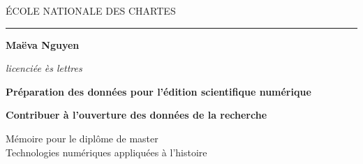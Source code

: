 \begin{titlepage}
    \begin{center}
        
        \bigskip
        
        \begin{large}
            ÉCOLE NATIONALE DES CHARTES
        \end{large}
        \begin{center}\rule{2cm}{0.02cm}\end{center}
        
        \bigskip
        \bigskip
        \bigskip
        \begin{Large}
            \textbf{Maëva Nguyen}\\
        \end{Large}
        \begin{normalsize} \textit{licenciée ès lettres}\\
        \end{normalsize}
        
        \bigskip
        \bigskip
        \bigskip
        
        \begin{Huge}
            \textbf{Préparation des données pour l'édition scientifique numérique}\\
        \end{Huge}
        \bigskip
        \bigskip
        \begin{LARGE}
            \textbf{Contribuer à l'ouverture des données de la recherche}\\
        \end{LARGE}
        
        \bigskip
        \bigskip
        \bigskip
        \begin{large}
        \end{large}
        \vfill
        
        \begin{large}
            Mémoire 
            pour le diplôme de master \\
            \og Technologies numériques appliquées à l'histoire~\fg\\
        \end{large}
        
    \end{center}
\end{titlepage}

